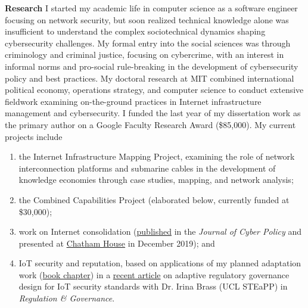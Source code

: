 \documentclass[11pt]{letter}
\begin{document}
\begin{letter}
\textbf{Research} \vspace{0.2 \baselineskip} \newline %
%
%
I started my academic life in computer science as a software engineer focusing on network security, but soon realized technical knowledge alone was insufficient to understand the complex sociotechnical dynamics shaping cybersecurity challenges.
%
My formal entry into the social sciences was through criminology and criminal justice, focusing on cybercrime, with an interest in informal norms and pro-social rule-breaking in the development of cybersecurity policy and best practices.
My doctoral research at MIT combined international political economy, operations strategy, and computer science to conduct extensive fieldwork examining on-the-ground practices in Internet infrastructure management and cybersecurity.
%
I funded the last year of my dissertation work as the primary author on a Google Faculty Research Award (\$85,000). 
%
My current projects include 
%
\begin{enumerate}
  \item the Internet Infrastructure Mapping Project, examining the role of network interconnection platforms and submarine cables in the development of knowledge economies through case studies, mapping, and network analysis; 
  \item the Combined Capabilities Project (elaborated below, currently funded at \$30,000); 
  \item work on Internet consolidation (\href{https://www.tandfonline.com/doi/full/10.1080/23738871.2020.1754443}{published} in the \emph{Journal of Cyber Policy} and presented at \href{https://www.chathamhouse.org/2019/12/internet-consolidation-what-lies-beneath-application-layer}{Chatham House} in December 2019); and 
  \item IoT security and reputation, based on applications of my planned adaptation work (\href{https://link.springer.com/chapter/10.1007/978-3-030-05252-2_13}{book chapter}) in a \href{https://onlinelibrary.wiley.com/doi/full/10.1111/rego.12343}{recent article} on adaptive regulatory governance design for IoT security standards with Dr. Irina Brass (UCL STEaPP) in \emph{Regulation \& Governance}.
\end{enumerate}%


\end{letter}
\end{document}
